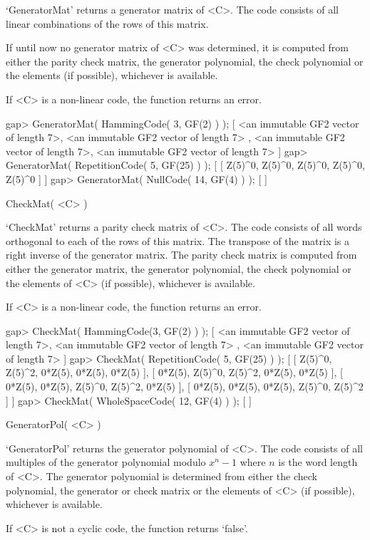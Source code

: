 `GeneratorMat'  returns a generator matrix  of <C>.  The code consists of
all linear combinations of the rows of this matrix.

If until now  no generator matrix of <C>  was determined,  it is computed
from either the parity check matrix, the  generator polynomial, the check
polynomial or the elements (if possible), whichever is available.

If <C> is a non-linear code, the function returns an error.

\beginexample
gap> GeneratorMat( HammingCode( 3, GF(2) ) );
[ <an immutable GF2 vector of length 7>, <an immutable GF2 vector of length 7>
    , <an immutable GF2 vector of length 7>, 
  <an immutable GF2 vector of length 7> ]
gap> GeneratorMat( RepetitionCode( 5, GF(25) ) );
[ [ Z(5)^0, Z(5)^0, Z(5)^0, Z(5)^0, Z(5)^0 ] ]
gap> GeneratorMat( NullCode( 14, GF(4) ) );
[  ]
\endexample

\>CheckMat( <C> )

`CheckMat' returns a parity check matrix of <C>. The code consists of all
words orthogonal to each of the rows of this matrix. The transpose of the
matrix is  a right  inverse of the   generator  matrix. The parity  check
matrix is  computed  from either   the generator  matrix, the   generator
polynomial, the  check polynomial or the  elements  of <C> (if possible),
whichever is available.

If <C> is a non-linear code, the function returns an error.

\beginexample
gap> CheckMat( HammingCode(3, GF(2) ) );
[ <an immutable GF2 vector of length 7>, <an immutable GF2 vector of length 7>
    , <an immutable GF2 vector of length 7> ]
gap> CheckMat( RepetitionCode( 5, GF(25) ) );
[ [ Z(5)^0, Z(5)^2, 0*Z(5), 0*Z(5), 0*Z(5) ],
  [ 0*Z(5), Z(5)^0, Z(5)^2, 0*Z(5), 0*Z(5) ],
  [ 0*Z(5), 0*Z(5), Z(5)^0, Z(5)^2, 0*Z(5) ],
  [ 0*Z(5), 0*Z(5), 0*Z(5), Z(5)^0, Z(5)^2 ] ]
gap> CheckMat( WholeSpaceCode( 12, GF(4) ) );
[  ] 
\endexample

\>GeneratorPol( <C> )

`GeneratorPol' returns the generator polynomial of <C>. The code consists
of all  multiples of the generator polynomial  modulo $x^{n}-1$ where $n$
is the word  length of <C>.  The generator polynomial is determined  from
either  the check  polynomial, the   generator   or check  matrix or  the
elements of <C> (if possible), whichever is available.

If <C> is not a cyclic code, the function returns `false'.

